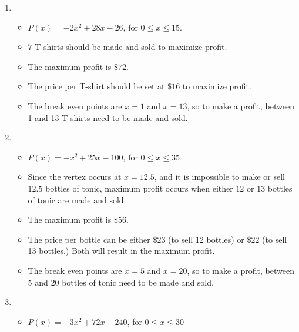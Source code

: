 \begin{enumerate}
\setcounter{enumi}{\value{HW}}

\item \begin{itemize}

\item $P(x) = -2x^2+28x-26$, for $0 \leq x \leq 15$.

\item $7$ T-shirts should be made and  sold to maximize profit. 

\item The maximum profit is $\$72$. 

\item The price per T-shirt should be set at $\$16$ to maximize profit. 

\item The break even points are $x=1$ and $x=13$, so to make a profit, between 1 and 13 T-shirts need to be made and sold.

\end{itemize}

\item  \begin{itemize}

\item   $P(x) = -x^2+25x-100$, for $0 \leq x \leq 35$

\item  Since the vertex occurs at $x=12.5$, and it is impossible to make or sell $12.5$ bottles of tonic, maximum profit occurs when either $12$ or $13$ bottles of tonic are made and sold.

\item  The maximum profit is $\$56$.

\item  The price per bottle can be either $\$23$ (to sell 12 bottles) or $\$22$ (to sell 13 bottles.)  Both will result in the maximum profit.

\item The break even points are $x=5$ and $x=20$, so to make a profit, between 5 and 20 bottles of tonic need to be made and sold.

\end{itemize}



\item \begin{itemize}

\item  $P(x) = -3x^2+72x-240$, for $0 \leq x \leq 30$


\end{itemize}
\end{enumerate}
